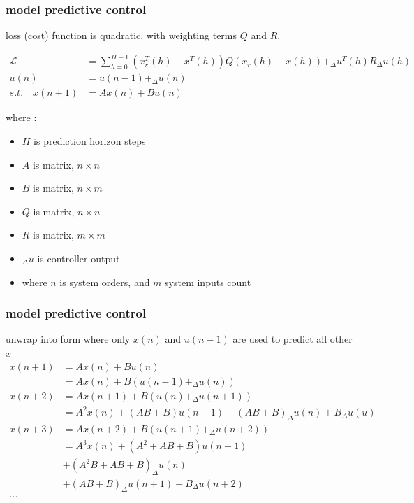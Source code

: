 \documentclass{beamer}
\begin{document}
\begin{frame}
  
  \frametitle{\bf model predictive control}

  loss (cost) function is quadratic, with weighting terms $Q$ and $R$,

  \begin{align*}
    \mathcal{L} &=\sum_{h=0}^{H-1} (x_r^T(h) - x^T(h)) Q (x_r(h) - x(h)) + _\Delta u^T(h) R _\Delta u(h) \\
    u(n) & = u(n-1) + _\Delta u(n) \\
    s.t. \quad x(n+1) &= Ax(n) + Bu(n) 
  \end{align*}  

  where : 
  \begin{itemize}
    \item $H$ is prediction horizon steps
    \item $A$ is matrix, $n \times n$
    \item $B$ is matrix, $n \times m$
    \item $Q$ is matrix, $n \times n$
    \item $R$ is matrix, $m \times m$
    \item $_\Delta u$ is controller output
    \item where $n$ is system orders, and $m$ system inputs count
  \end{itemize}

  
\end{frame}


\begin{frame}
  
  \frametitle{\bf model predictive control}
  unwrap into form where only $x(n)$ and $u(n-1)$ are used to predict all other $x$
  \begin{align*}
    x(n+1)&= Ax(n) + Bu(n) \\
          &= Ax(n) + B(u(n-1) + _\Delta u(n)) \\
    x(n+2)&= Ax(n+1) + B(u(n) + _\Delta u(n+1)) \\
          &= A^2x(n) + (AB + B)u(n-1) + (AB+B)_\Delta u(n) + B_\Delta u(u) \\
    x(n+3)&= Ax(n+2) + B(u(n+1) + _\Delta u(n+2)) \\
          &= A^3x(n) + (A^2 + AB + B)u(n-1) \\
          & + (A^2B + AB + B)_\Delta u(n) \\
          & + (AB + B)_\Delta u(n+1) + B_\Delta u(n+2) \\
    ... 
  \end{align*}  

  
\end{frame}
\end{document}
